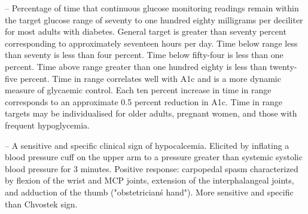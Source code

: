 -- Percentage of time that continuous glucose monitoring readings remain within the target glucose range of seventy to one hundred eighty milligrams per deciliter for most adults with diabetes. General target is greater than seventy percent corresponding to approximately seventeen hours per day. Time below range less than seventy is less than four percent. Time below fifty-four is less than one percent. Time above range greater than one hundred eighty is less than twenty-five percent. Time in range correlates well with A1c and is a more dynamic measure of glycaemic control. Each ten percent increase in time in range corresponds to an approximate 0.5 percent reduction in A1c. Time in range targets may be individualised for older adults, pregnant women, and those with frequent hypoglycemia.

-- A sensitive and specific clinical sign of hypocalcemia. Elicited by inflating a blood pressure cuff on the upper arm to a pressure greater than systemic systolic blood pressure for 3 minutes. Positive response: carpopedal spasm characterized by flexion of the wrist and MCP joints, extension of the interphalangeal joints, and adduction of the thumb ("obstetrician\'s hand"). More sensitive and specific than Chvostek sign.

